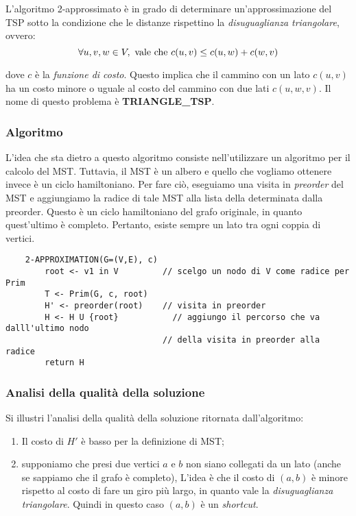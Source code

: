 L'algoritmo 2-approssimato è in grado di determinare un'approssimazione del TSP sotto la condizione che le
distanze rispettino la \textit{disuguaglianza triangolare}, ovvero:
\begin{equation}
    \forall u, v, w \in V, \textnormal{ vale che } c(u, v) \le c(u, w) + c(w, v)
\end{equation}

dove $c$ è la \textit{funzione di costo}. Questo implica che il cammino con un lato $c(u, v)$ ha un costo
minore o uguale al costo del cammino con due lati $c(u, w, v)$. Il nome di questo problema è \textbf{TRIANGLE\_TSP}.

\subsubsection{Algoritmo}

L'idea che sta dietro a questo algoritmo consiste nell'utilizzare un algoritmo per il calcolo
del MST. Tuttavia, il MST è un albero e quello che vogliamo ottenere invece è un
ciclo hamiltoniano. Per fare ciò, eseguiamo una visita in \textit{preorder} del MST
e aggiungiamo la radice di tale MST alla lista della determinata dalla preorder. Questo è un ciclo
hamiltoniano del grafo originale, in quanto quest'ultimo è completo. Pertanto, esiste sempre un
lato tra ogni coppia di vertici.

\begin{verbatim}
    2-APPROXIMATION(G=(V,E), c)
        root <- v1 in V         // scelgo un nodo di V come radice per Prim
        T <- Prim(G, c, root)
        H' <- preorder(root)    // visita in preorder
        H <- H U {root}           // aggiungo il percorso che va dalll'ultimo nodo
                                // della visita in preorder alla radice
        return H

\end{verbatim}

\subsubsection{Analisi della qualità della soluzione}

Si illustri l'analisi della qualità della soluzione ritornata dall'algoritmo:
\begin{enumerate}
    \item Il costo di $H'$ è basso per la definizione di MST;
    \item supponiamo che presi due vertici $a$ e $b$ non siano collegati da un lato (anche se
    sappiamo che il grafo è completo), L'idea è che il costo di $(a, b)$ è minore rispetto
    al costo di fare un giro più largo, in quanto vale la \textit{disuguaglianza triangolare}.
    Quindi in questo caso $(a, b)$ è un \textit{shortcut}.
\end{enumerate}

